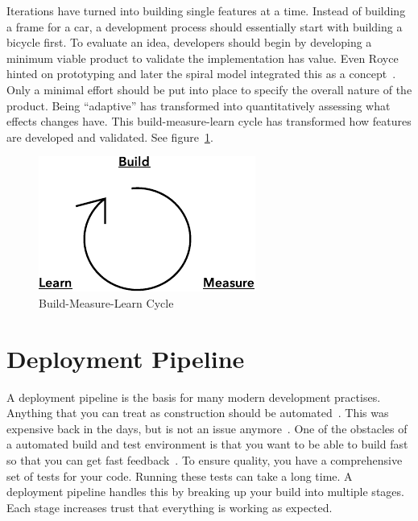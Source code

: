 \documentclass[english]{tktltiki2}
\begin{document}
Iterations have turned into building single features at a time. Instead of building a frame for a car, a development process should essentially start with building a bicycle first. To evaluate an idea, developers should begin by developing a minimum viable product to validate the implementation has value. Even Royce hinted on prototyping and later the spiral model integrated this as a concept~\cite{Roy70, Boe88}. Only a minimal effort should be put into place to specify the overall nature of the product. Being “adaptive” has transformed into quantitatively assessing what effects changes have. This build-measure-learn cycle has transformed how features are developed and validated. See figure~\ref{figure:build-measure-learn}.

\begin{figure}[h!]

    \vspace{1cm}
    \centering

    \includegraphics{figures/build-measure-learn}

    \caption{Build-Measure-Learn Cycle}
    \label{figure:build-measure-learn}

\end{figure}


\section{Deployment Pipeline}

A deployment pipeline is the basis for many modern development practises. Anything that you can treat as construction should be automated~\cite{Fow05}. This was expensive back in the days, but is not an issue anymore~\cite{Roy70}. One of the obstacles of a automated build and test environment is that you want to be able to build fast so that you can get fast feedback~\cite{Fow13b}. To ensure quality, you have a comprehensive set of tests for your code. Running these tests can take a long time. A deployment pipeline handles this by breaking up your build into multiple stages. Each stage increases trust that everything is working as expected.
\end{document}
